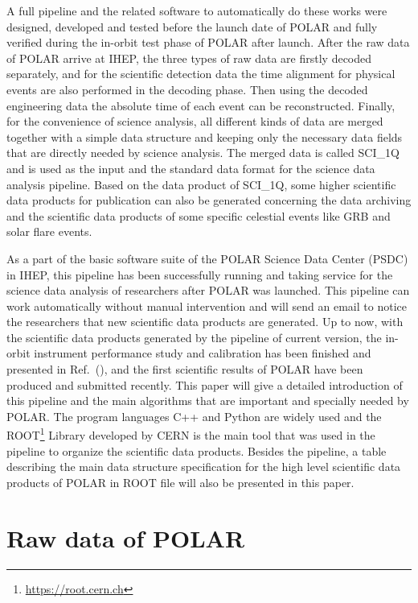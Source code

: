 \documentclass{raa}
\begin{document}
A full pipeline and the related software to automatically do these works were designed, developed and tested before the launch date of POLAR and fully verified during the in-orbit test phase of POLAR after launch. After the raw data of POLAR arrive at IHEP, the three types of raw data are firstly decoded separately, and for the scientific detection data the time alignment for physical events are also performed in the decoding phase. Then using the decoded engineering data the absolute time of each event can be reconstructed. Finally, for the convenience of science analysis, all different kinds of data are merged together with a simple data structure and keeping only the necessary data fields that are directly needed by science analysis. The merged data is called SCI\_1Q and is used as the input and the standard data format for the science data analysis pipeline. Based on the data product of SCI\_1Q, some higher scientific data products for publication can also be generated concerning the data archiving and the scientific data products of some specific celestial events like GRB and solar flare events.

As a part of the basic software suite of the POLAR Science Data Center (PSDC) in IHEP, this pipeline has been successfully running and taking service for the science data analysis of researchers after POLAR was launched. This pipeline can work automatically without manual intervention and will send an email to notice the researchers that new scientific data products are generated. Up to now, with the scientific data products generated by the pipeline of current version, the in-orbit instrument performance study and calibration has been finished and presented in Ref.~(\citealt{LI20188}), and the first scientific results of POLAR have been produced and submitted recently. This paper will give a detailed introduction of this pipeline and the main algorithms that are important and specially needed by POLAR. The program languages C++ and Python are widely used and the ROOT\footnote{\url{https://root.cern.ch}} Library developed by CERN is the main tool that was used in the pipeline to organize the scientific data products. Besides the pipeline, a table describing the main data structure specification for the high level scientific data products of POLAR in ROOT file will also be presented in this paper.

\section{Raw data of POLAR}\label{sec:raw_data}
\end{document}
